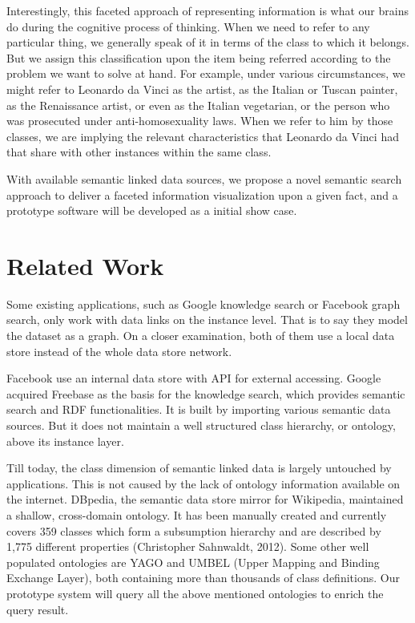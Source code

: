 \documentclass[12pt]{cls}
\begin{document}
Interestingly, this faceted approach of representing information is what our brains do during the cognitive process of thinking. When we need to refer to any particular thing, we generally speak of it in terms of the class to which it belongs. But we assign this classification upon the item being referred according to the problem we want to solve at hand. For example, under various circumstances, we might refer to Leonardo da Vinci as the artist, as the Italian or Tuscan painter, as the Renaissance artist, or even as the Italian vegetarian, or the person who was prosecuted under anti-homosexuality laws. When we refer to him by those classes, we are implying the relevant characteristics that Leonardo da Vinci had that share with other instances within the same class.

With available semantic linked data sources, we propose a novel semantic search approach to deliver a faceted information visualization upon a given fact, and a prototype software will be developed as a initial show case.

\section{Related Work}

Some existing applications, such as Google knowledge search or Facebook graph search, only work with data links on the instance level. That is to say they model the dataset as a graph. On a closer examination, both of them use a local data store instead of the whole data store network.

Facebook use an internal data store with API for external accessing. Google acquired Freebase as the basis for the knowledge search, which provides semantic search and RDF functionalities. It is built by importing various semantic data sources. But it does not maintain a well structured class hierarchy, or ontology, above its instance layer.

Till today, the class dimension of semantic linked data is largely untouched by applications. This is not caused by the lack of ontology information available on the internet. DBpedia, the semantic data store mirror for Wikipedia, maintained a shallow, cross-domain ontology. It has been manually created and currently covers 359 classes which form a subsumption hierarchy and are described by 1,775 different properties (Christopher Sahnwaldt, 2012). Some other well populated ontologies are YAGO and UMBEL (Upper Mapping and Binding Exchange Layer), both containing more than thousands of class definitions. Our prototype system will query all the above mentioned ontologies to enrich the query result.
\end{document}
